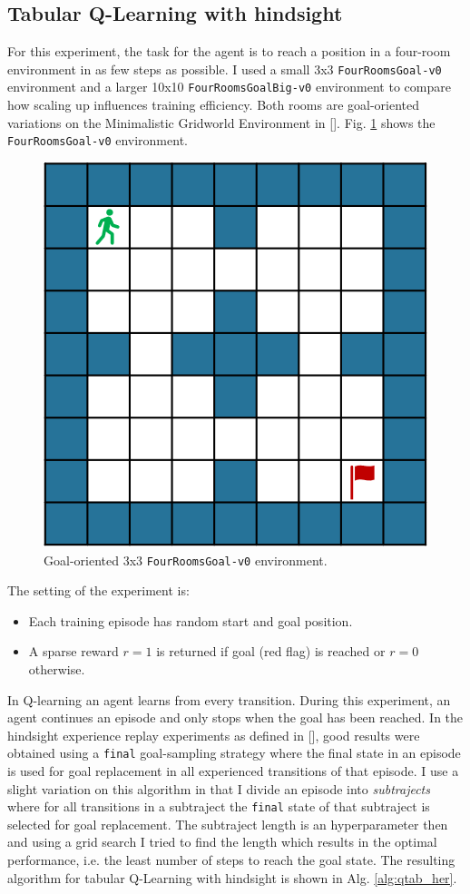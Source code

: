 \documentclass[conference]{IEEEtran}
\begin{document}
\subsection{Tabular Q-Learning with hindsight} \label{subsec:exp_tab_her}
For this experiment, the task for the agent is to reach a position in a four-room environment in as few steps as possible. I used a small 3x3 \texttt{FourRoomsGoal-v0} environment and a larger 10x10 \texttt{FourRoomsGoalBig-v0} environment to compare how scaling up influences training efficiency. Both rooms are goal-oriented variations on the Minimalistic Gridworld Environment in [\cite{gym_minigrid}]. Fig. \ref{fig:tabular_fourroomsgoal_env} shows the \texttt{FourRoomsGoal-v0} environment.
\begin{figure}[ht]
\centering
\includegraphics[width=0.5\columnwidth]{img/FourRoomsGoal-v0.png}
\caption{Goal-oriented 3x3 \texttt{FourRoomsGoal-v0} environment.}
\label{fig:tabular_fourroomsgoal_env}
\end{figure}
The setting of the experiment is:
\begin{itemize}
    \item Each training episode has random start and goal position.
    \item A sparse reward $r = 1$ is returned if goal (red flag) is reached or $r = 0$ otherwise.
\end{itemize}
In Q-learning an agent learns from every transition. During this experiment, an agent continues an episode and only stops when the goal has been reached.
In the hindsight experience replay experiments as defined in [\cite{andrychowicz2017hindsight}], good results were obtained using a \texttt{final} goal-sampling strategy where the final state in an episode is used for goal replacement in all experienced transitions of that episode. I use a slight variation on this algorithm in that I divide an episode into \textit{subtrajects} where for all transitions in a subtraject the \texttt{final} state of that subtraject is selected for goal replacement. The subtraject length is an hyperparameter then and using a grid search I tried to find the length which results in the optimal performance, i.e. the least number of steps to reach the goal state. The resulting algorithm for tabular Q-Learning with hindsight is shown in Alg. \ref{alg:qtab_her}.
\end{document}

